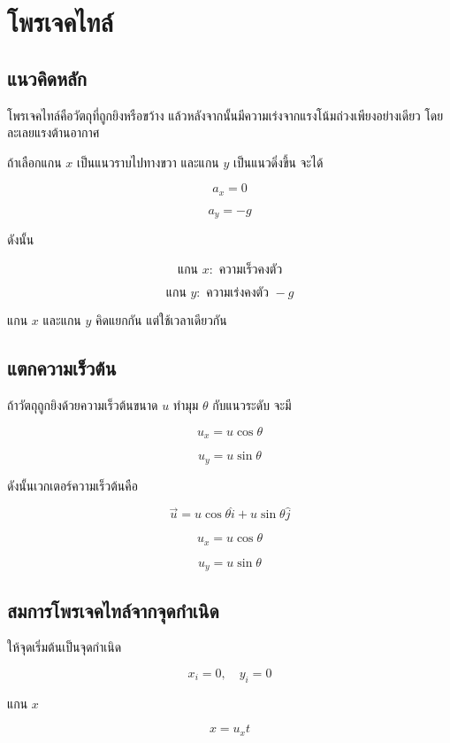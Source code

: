 \section{โพรเจคไทล์}

\subsection{แนวคิดหลัก}

โพรเจคไทล์คือวัตถุที่ถูกยิงหรือขว้าง แล้วหลังจากนั้นมีความเร่งจากแรงโน้มถ่วงเพียงอย่างเดียว โดยละเลยแรงต้านอากาศ

ถ้าเลือกแกน $x$ เป็นแนวราบไปทางขวา และแกน $y$ เป็นแนวดิ่งขึ้น จะได้

\[
a_x=0
\]

\[
a_y=-g
\]

ดังนั้น

\[
\text{แกน }x:\text{ ความเร็วคงตัว}
\]

\[
\text{แกน }y:\text{ ความเร่งคงตัว } -g
\]

\begin{tcolorbox}[title=หัวใจของโพรเจคไทล์]
แกน $x$ และแกน $y$ คิดแยกกัน แต่ใช้เวลาเดียวกัน
\end{tcolorbox}

\subsection{แตกความเร็วต้น}

ถ้าวัตถุถูกยิงด้วยความเร็วต้นขนาด $u$ ทำมุม $\theta$ กับแนวระดับ จะมี

\[
u_x=u\cos\theta
\]

\[
u_y=u\sin\theta
\]

ดังนั้นเวกเตอร์ความเร็วต้นคือ

\[
\vec{u}=u\cos\theta\hat{i}+u\sin\theta\hat{j}
\]

\begin{tcolorbox}[title=องค์ประกอบความเร็วต้น]
\[
u_x=u\cos\theta
\]

\[
u_y=u\sin\theta
\]
\end{tcolorbox}

\subsection{สมการโพรเจคไทล์จากจุดกำเนิด}

ให้จุดเริ่มต้นเป็นจุดกำเนิด

\[
x_i=0,\quad y_i=0
\]

แกน $x$

\[
x=u_xt
\]

